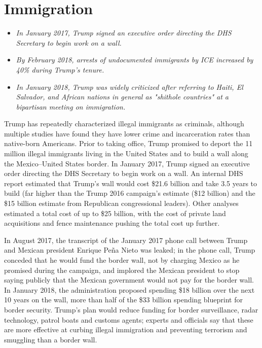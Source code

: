 \section{Immigration}\label{immigration}

\begin{itemize}
\item
  \emph{In January 2017, Trump signed an executive order directing the
  DHS Secretary to begin work on a wall.}
\item
  \emph{By February 2018, arrests of undocumented immigrants by ICE
  increased by 40\% during Trump's tenure.}
\item
  \emph{In January 2018, Trump was widely criticized after referring to
  Haiti, El Salvador, and African nations in general as "shithole
  countries" at a bipartisan meeting on immigration.}
\end{itemize}

Trump has repeatedly characterized illegal immigrants as criminals,
although multiple studies have found they have lower crime and
incarceration rates than native-born Americans. Prior to taking office,
Trump promised to deport the 11 million illegal immigrants living in the
United States and to build a wall along the Mexico--United States
border. In January 2017, Trump signed an executive order directing the
DHS Secretary to begin work on a wall. An internal DHS report estimated
that Trump's wall would cost \$21.6 billion and take 3.5 years to build
(far higher than the Trump 2016 campaign's estimate (\$12 billion) and
the \$15 billion estimate from Republican congressional leaders). Other
analyses estimated a total cost of up to \$25 billion, with the cost of
private land acquisitions and fence maintenance pushing the total cost
up further.

In August 2017, the transcript of the January 2017 phone call between
Trump and Mexican president Enrique Peña Nieto was leaked; in the phone
call, Trump conceded that he would fund the border wall, not by charging
Mexico as he promised during the campaign, and implored the Mexican
president to stop saying publicly that the Mexican government would not
pay for the border wall. In January 2018, the administration proposed
spending \$18 billion over the next 10 years on the wall, more than half
of the \$33 billion spending blueprint for border security. Trump's plan
would reduce funding for border surveillance, radar technology, patrol
boats and customs agents; experts and officials say that these are more
effective at curbing illegal immigration and preventing terrorism and
smuggling than a border wall.

